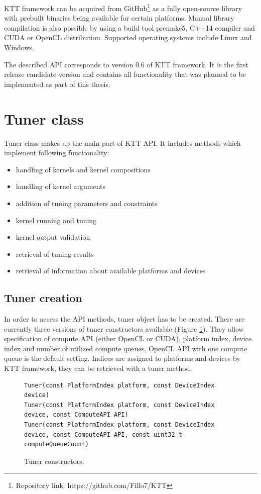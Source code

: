 \documentclass
[
    digital, %
    oneside, %
    table, %
    nolof, %
    nolot, %
    nocover %
]{fithesis3}
\begin{document}
KTT framework can be acquired from GitHub\footnote{Repository link: https://github.com/Fillo7/KTT} as a fully open-source library with prebuilt
binaries being available for certain platforms. Manual library compilation is also possible by using a build tool premake5, C++14 compiler and CUDA
or OpenCL distribution. Supported operating systems include Linux and Windows.

The described API corresponds to version 0.6 of KTT framework. It is the first release candidate version and contains all functionality that was
planned to be implemented as part of this thesis.

\section{Tuner class}
Tuner class makes up the main part of KTT API. It includes methods which implement following functionality:
\begin{itemize}
    \item handling of kernels and kernel compositions
    \item handling of kernel arguments
    \item addition of tuning parameters and constraints
    \item kernel running and tuning
    \item kernel output validation
    \item retrieval of tuning results
    \item retrieval of information about available platforms and devices
\end{itemize}

\subsection{Tuner creation}
In order to access the API methods, tuner object has to be created. There are currently three versions of tuner constructors available (Figure 
\ref{ktt-constructors}). They allow specification of compute API (either OpenCL or CUDA), platform index, device index and number of utilized compute
queues. OpenCL API with one compute queue is the default setting. Indices are assigned to platforms and devices by KTT framework, they can be retrieved
with a tuner method.

\begin{figure}
\begin{adjustwidth}{-1cm}{-1cm}
\begin{lstlisting}
Tuner(const PlatformIndex platform, const DeviceIndex device)
Tuner(const PlatformIndex platform, const DeviceIndex device, const ComputeAPI API)
Tuner(const PlatformIndex platform, const DeviceIndex device, const ComputeAPI API, const uint32_t computeQueueCount)
\end{lstlisting}
\caption{Tuner constructors.}
\label{ktt-constructors}
\end{adjustwidth}
\end{figure}
\end{document}
